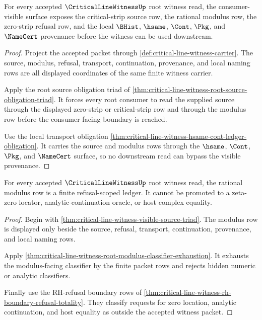 \begin{theorem}
\label{thm:critical-line-witness-visible-source-triad}
For every accepted $\CriticalLineWitnessUp$ root witness read, the consumer-visible surface exposes the critical-strip source row, the rational modulus row, the zero-strip refusal row, and the local $\BHist$, $\hsame$, $\Cont$, $\Pkg$, and $\NameCert$ provenance before the witness can be used downstream.
\end{theorem}
\begin{proof}
Project the accepted packet through \autoref{def:critical-line-witness-carrier}. The source, modulus, refusal, transport, continuation, provenance, and local naming rows are all displayed coordinates of the same finite witness carrier.

Apply the root source obligation triad of \autoref{thm:critical-line-witness-root-source-obligation-triad}. It forces every root consumer to read the supplied source through the displayed zero-strip or critical-strip row and through the modulus row before the consumer-facing boundary is reached.

Use the local transport obligation \autoref{thm:critical-line-witness-hsame-cont-ledger-obligation}. It carries the source and modulus rows through the $\hsame$, $\Cont$, $\Pkg$, and $\NameCert$ surface, so no downstream read can bypass the visible provenance.
\end{proof}

\begin{theorem}
\label{thm:critical-line-witness-modulus-refusal-scope}
For every accepted $\CriticalLineWitnessUp$ root witness read, the rational modulus row is a finite refusal-scoped ledger. It cannot be promoted to a zeta-zero locator, analytic-continuation oracle, or host complex equality.
\end{theorem}
\begin{proof}
Begin with \autoref{thm:critical-line-witness-visible-source-triad}. The modulus row is displayed only beside the source, refusal, transport, continuation, provenance, and local naming rows.

Apply \autoref{thm:critical-line-witness-root-modulus-classifier-exhaustion}. It exhausts the modulus-facing classifier by the finite packet rows and rejects hidden numeric or analytic classifiers.

Finally use the RH-refusal boundary rows of \autoref{thm:critical-line-witness-rh-boundary-refusal-totality}. They classify requests for zero location, analytic continuation, and host equality as outside the accepted witness packet.
\end{proof}

